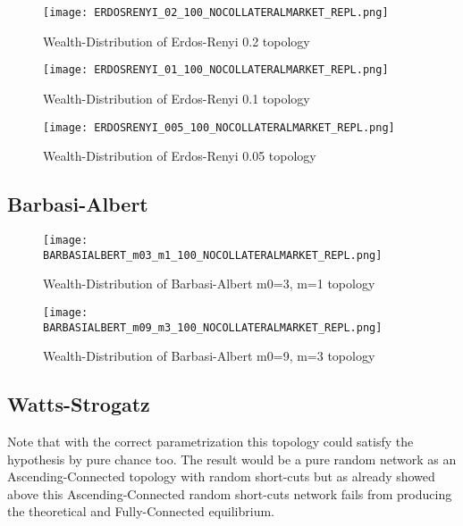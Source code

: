 \documentclass[Bachelorarbeit.tex]{subfiles}
\begin{document}
\begin{figure}[H]
	\centering
  \texttt{[image: ERDOSRENYI\_02\_100\_NOCOLLATERALMARKET\_REPL.png]}
	\caption{Wealth-Distribution of Erdos-Renyi 0.2 topology}
	\label{fig:wealth_ERDOSRENYI_02_100_NOCOLLATERALMARKET_REPL}
\end{figure}

\begin{figure}[H]
	\centering
  \texttt{[image: ERDOSRENYI\_01\_100\_NOCOLLATERALMARKET\_REPL.png]}
	\caption{Wealth-Distribution of Erdos-Renyi 0.1 topology}
	\label{fig:wealth_ERDOSRENYI_01_100_NOCOLLATERALMARKET_REPL}
\end{figure}

\begin{figure}[H]
	\centering
  \texttt{[image: ERDOSRENYI\_005\_100\_NOCOLLATERALMARKET\_REPL.png]}
	\caption{Wealth-Distribution of Erdos-Renyi 0.05 topology}
	\label{fig:wealth_ERDOSRENYI_005_100_NOCOLLATERALMARKET_REPL}
\end{figure}

\subsection{Barbasi-Albert}
\begin{figure}[H]
	\centering
  \texttt{[image: BARBASIALBERT\_m03\_m1\_100\_NOCOLLATERALMARKET\_REPL.png]}
	\caption{Wealth-Distribution of Barbasi-Albert m0=3, m=1 topology}
	\label{fig:wealth_BARBASIALBERT_m03_m1_100_NOCOLLATERALMARKET_REPL}
\end{figure}

\begin{figure}[H]
	\centering
  \texttt{[image: BARBASIALBERT\_m09\_m3\_100\_NOCOLLATERALMARKET\_REPL.png]}
	\caption{Wealth-Distribution of Barbasi-Albert m0=9, m=3 topology}
	\label{fig:wealth_BARBASIALBERT_m09_m3_100_NOCOLLATERALMARKET_REPL}
\end{figure}

\subsection{Watts-Strogatz}
Note that with the correct parametrization this topology could satisfy the hypothesis by pure chance too. The result would be a pure random network as an Ascending-Connected topology with random short-cuts but as already showed above this Ascending-Connected random short-cuts network fails from producing the theoretical and Fully-Connected equilibrium.
\end{document}
